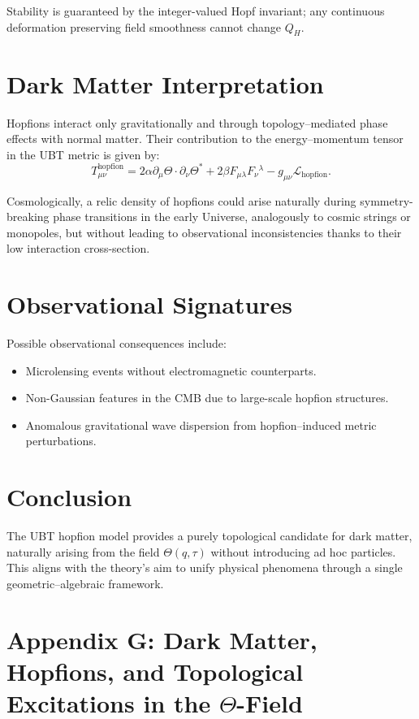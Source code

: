 Stability is guaranteed by the integer-valued Hopf invariant; any continuous deformation preserving field smoothness cannot change \(Q_H\).

\section*{Dark Matter Interpretation}
Hopfions interact only gravitationally and through topology–mediated phase effects with normal matter. Their contribution to the energy–momentum tensor in the UBT metric is given by:
\begin{equation}
T_{\mu\nu}^{\text{hopfion}} = 2\alpha \partial_\mu \Theta \cdot \partial_\nu \Theta^* + 2\beta F_{\mu\lambda} F_{\nu}{}^\lambda - g_{\mu\nu} \mathcal{L}_{\text{hopfion}}.
\end{equation}

Cosmologically, a relic density of hopfions could arise naturally during symmetry-breaking phase transitions in the early Universe, analogously to cosmic strings or monopoles, but without leading to observational inconsistencies thanks to their low interaction cross-section.

\section*{Observational Signatures}
Possible observational consequences include:
\begin{itemize}
\item Microlensing events without electromagnetic counterparts.
\item Non-Gaussian features in the CMB due to large-scale hopfion structures.
\item Anomalous gravitational wave dispersion from hopfion–induced metric perturbations.
\end{itemize}

\section*{Conclusion}
The UBT hopfion model provides a purely topological candidate for dark matter, naturally arising from the field \(\Theta(q,\tau)\) without introducing ad hoc particles. This aligns with the theory’s aim to unify physical phenomena through a single geometric–algebraic framework.

\section*{Appendix G: Dark Matter, Hopfions, and Topological Excitations in the $\Theta$-Field}
